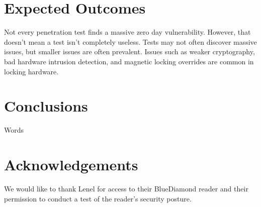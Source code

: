 \documentclass[10pt,twocolumn,letterpaper]{article}
\begin{document}
\section{Expected Outcomes}
Not every penetration test finds a massive zero day vulnerability.  However, that doesn't mean a test isn't completely useless.  Tests may not often discover massive issues, but smaller issues are often prevalent.  Issues such as weaker cryptography, bad hardware intrusion detection, and magnetic locking overrides are common in locking hardware.

\section{Conclusions}
Words

\section{Acknowledgements}
We would like to thank Lenel for access to their BlueDiamond reader and their permission to conduct a test of the reader's security posture.



\end{document}
